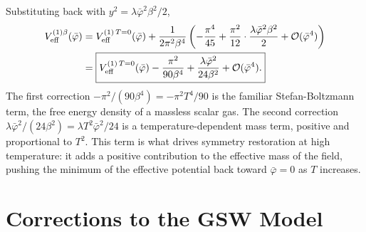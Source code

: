 Substituting back with $y^2 = \lambda\bar\varphi^2\beta^2/2$,
\begin{align}
	V_{\text{eff}}^{(1)\beta}(\bar\varphi)
	 & = V_{\text{eff}}^{(1)\,T=0}(\bar\varphi)
	+ \frac{1}{2\pi^2\beta^4}
	\left(-\frac{\pi^4}{45}
	+ \frac{\pi^2}{12}\cdot\frac{\lambda\bar\varphi^2\beta^2}{2}
	+ \mathcal{O}(\bar\varphi^4)\right) \notag        \\
	 & = \boxed{V_{\text{eff}}^{(1)\,T=0}(\bar\varphi)
		     - \frac{\pi^2}{90\beta^4}
		     + \frac{\lambda\bar\varphi^2}{24\beta^2}
		     + \mathcal{O}(\bar\varphi^4).}
\end{align}
The first correction $-\pi^2/(90\beta^4) = -\pi^2 T^4/90$ is the
familiar Stefan-Boltzmann term, the free energy density of a massless
scalar gas. The second correction $\lambda\bar\varphi^2/(24\beta^2)
	= \lambda T^2\bar\varphi^2/24$ is a temperature-dependent mass term,
positive and proportional to $T^2$. This term is what drives symmetry
restoration at high temperature: it adds a positive contribution to the
effective mass of the field, pushing the minimum of the effective
potential back toward $\bar\varphi = 0$ as $T$ increases.

\section{Corrections to the GSW Model}

